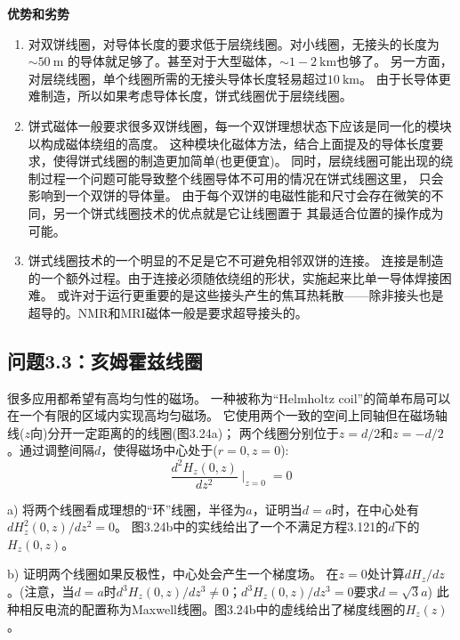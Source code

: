 \textbf{优势和劣势}
\begin{enumerate}
	\item 对双饼线圈，对导体长度的要求低于层绕线圈。对小线圈，无接头的长度为$\sim 50\ \mathrm{m}$
	的导体就足够了。甚至对于大型磁体，$\sim 1-2\ \mathrm{km}$也够了。
	另一方面，对层绕线圈，单个线圈所需的无接头导体长度轻易超过$10\ \mathrm{km}$。
	由于长导体更难制造，所以如果考虑导体长度，饼式线圈优于层绕线圈。

	\item 饼式磁体一般要求很多双饼线圈，每一个双饼理想状态下应该是同一化的模块以构成磁体绕组的高度。
	这种模块化磁体方法，结合上面提及的导体长度要求，使得饼式线圈的制造更加简单(也更便宜)。
	同时，层绕线圈可能出现的绕制过程一个问题可能导致整个线圈导体不可用的情况在饼式线圈这里，
	只会影响到一个双饼的导体量。
	由于每个双饼的电磁性能和尺寸会存在微笑的不同，另一个饼式线圈技术的优点就是它让线圈置于
	其最适合位置的操作成为可能。

	\item 饼式线圈技术的一个明显的不足是它不可避免相邻双饼的连接。
	连接是制造的一个额外过程。由于连接必须随依绕组的形状，实施起来比单一导体焊接困难。
	或许对于运行更重要的是这些接头产生的焦耳热耗散——除非接头也是超导的。NMR和MRI磁体一般是要求超导接头的。
\end{enumerate}

\newpage

\subsection{问题3.3：亥姆霍兹线圈}
很多应用都希望有高均匀性的磁场。
一种被称为“Helmholtz coil”的简单布局可以在一个有限的区域内实现高均匀磁场。
它使用两个一致的空间上同轴但在磁场轴线($z$向)分开一定距离的的线圈(图3.24a)；
两个线圈分别位于$z = d/2$和$z = −d/2$。通过调整间隔$d$，使得磁场中心处于($r=0,z=0$):
\begin{equation}%
\frac{d^2H_z(0,z)}{dz^2}\mid_{z=0}=0
\end{equation}

a) 将两个线圈看成理想的“环”线圈，半径为$a$，证明当$d=a$时，在中心处有$dH^2_z(0, z)/dz^2 = 0$。
图3.24b中的实线给出了一个不满足方程3.121的$d$下的$H_z(0, z)$。

b) 证明两个线圈如果反极性，中心处会产生一个梯度场。
在$z=0$处计算$dH_z/dz$。(注意，当$d=a$时$d^3H_z(0,z)/dz^3 \neq 0$；$d^3H_z(0,z)/dz^3=0$要求$d=\sqrt{3}a$) 
此种相反电流的配置称为Maxwell线圈。图3.24b中的虚线给出了梯度线圈的$H_z(z)$。

